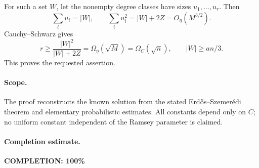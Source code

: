 For such a set \(W\), let the nonempty degree classes have sizes
\(u_1,\ldots,u_r\). Then
\[
 \sum_i u_i=|W|,\qquad
 \sum_i u_i^2=|W|+2Z=O_\eta(M^{3/2}).
\]
Cauchy--Schwarz gives
\[
 r\geq\frac{|W|^2}{|W|+2Z}
   =\Omega_\eta(\sqrt M)=\Omega_C(\sqrt n),
 \qquad |W|\geq an/3.
\]
This proves the requested assertion.

\paragraph{Scope.}
The proof reconstructs the known solution from the stated
Erd\H{o}s--Szemer\'edi theorem and elementary probabilistic estimates.
All constants depend only on \(C\); no uniform constant independent
of the Ramsey parameter is claimed.

\paragraph{Completion estimate.}
\textbf{COMPLETION: 100\%}
